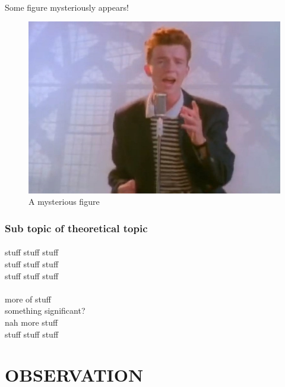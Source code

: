 \documentclass[11pt,a4paper]{article}
\begin{document}
\paragraph{}
Some figure mysteriously appears!

\begin{figure}[h!]
	\centering
	\includegraphics[width=450pt]{fig.png}
	\caption{A mysterious figure}
	\label{fig:fig1}
\end{figure}

\subsubsection*{Sub topic of theoretical topic}

\paragraph{}
stuff stuff stuff\\
stuff stuff stuff\\
stuff stuff stuff\\

\paragraph*{}
more of stuff\\
something significant?\\
nah more stuff\\
stuff stuff stuff\\

\section*{OBSERVATION}
\end{document}
